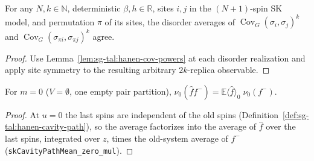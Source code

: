 \begin{lemma}\label{lem:sg-tal:hanen-cov-site-symmetry}
\leanok
For any $N,k\in\mathbb N$, deterministic $\beta,h\in\mathbb R$, sites $i,j$ in the
$(N+1)$-spin SK model, and permutation $\pi$ of its sites, the disorder averages of
$\operatorname{Cov}_{G}(\sigma_i,\sigma_j)^k$ and
$\operatorname{Cov}_{G}(\sigma_{\pi i},\sigma_{\pi j})^k$ agree.
\end{lemma}
\begin{proof}
\leanok
Use Lemma~\ref{lem:sg-tal:hanen-cov-powers} at each disorder realization and apply
site symmetry to the resulting arbitrary $2k$-replica observable.
\end{proof}

\begin{lemma}[Pairing formula, case $m=0$]\label{lem:sg-tal:hanen-pairing-derivative-zero}
\leanok
{}
For $m=0$ ($V=\emptyset$, one empty pair partition), $\nu_0(\hat f f^-)=\mathbb E\langle\hat f\rangle_0\;\nu_0(f^-)$.
\end{lemma}
\begin{proof}
\leanok
At $u=0$ the last spins are independent of the old spins (Definition~\ref{def:sg-tal:hanen-cavity-path}), so the average factorizes into the average of $\hat f$ over the last spins,
integrated over $z$, times the old-system average of $f^-$ (\texttt{skCavityPathMean\_zero\_mul}).
\end{proof}


